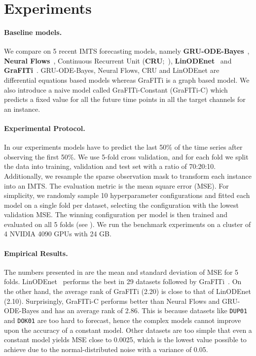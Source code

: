 \section{Experiments}\label{sec:experiments}

\paragraph{Baseline models.}

We compare on 5 recent IMTS forecasting models, namely \textbf{GRU-ODE-Bayes}~\citep{DeBrouwer2019.GRUODEBayesd}, \textbf{Neural Flows}~\citep{Bilos2021.Neurald}, Continuous Recurrent Unit (\textbf{CRU};~\citealp{Schirmer2022.Modelingb}), \textbf{LinODEnet}~\citep{Scholz2022.Latenta,mione_workflow_management_system_2024} and \textbf{GraFITi}~\citep{Yalavarthi2024.GraFITi}.
GRU-ODE-Bayes, Neural Flows, CRU and LinODEnet are differential equations based models whereas GraFITi is a graph based model.
We also introduce a naive model called GraFITi-Constant (GraFITi-C) which predicts a fixed value for all the future time points in all the target channels for an instance.


\paragraph{Experimental Protocol.}
In our experiments models have to predict the last 50\% of the time series after observing the first 50\%.
We use 5-fold cross validation, and for each fold we split the data into training, validation and test set with a ratio of 70:20:10.
Additionally, we resample the sparse observation mask to transform each instance into an IMTS\@.
The evaluation metric is the mean square error (MSE).
For simplicity, we randomly sample 10 hyperparameter configurations and fitted each model on a single fold per dataset, selecting the configuration with the lowest validation MSE\@.
The winning configuration per model is then trained and evaluated on all 5 folds (see ).
We run the benchmark experiments on a cluster of 4 NVIDIA 4090 GPUs with 24 GB\@.

\paragraph{Empirical Results.}\label{sec:experiments_imts_bench}
The numbers presented in  are the mean and standard deviation of MSE for 5 folds.
LinODEnet~\citep{Scholz2022.Latenta,mione_workflow_management_system_2024} performs the best in 29 datasets followed by GraFITi~\citep{Yalavarthi2024.GraFITi}.
On the other hand, the average rank of GraFITi (2.20) is close to that of LinODEnet (2.10).
Surprisingly, GraFITi-C performs better than Neural Flows and GRU-ODE-Bayes and has an average rank of 2.86.
This is because datasets like \texttt{DUP01} and \texttt{DOK01} are too hard to forecast, hence the complex models cannot improve upon the accuracy of a constant model.
Other datasets are too simple that even a constant model yields MSE close to 0.0025,
which is the lowest value possible to achieve due to the normal-distributed noise with a variance of 0.05.

